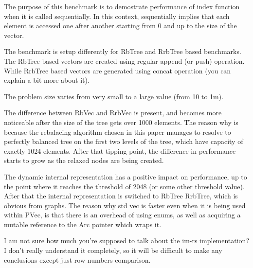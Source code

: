 

The purpose of this benchmark is to demostrate performance of index function when it is called sequentially. In this context, sequentially implies that each element is accessed one after another starting from 0 and up to the size of the vector.

The benchmark is setup differently for RbTree and RrbTree based benchmarks. The RbTree based vectors are created using regular append (or push) operation. While RrbTree based vectors are generated using concat operation (you can explain a bit more about it). 

The problem size varies from very small to a large value (from 10 to 1m). 

The difference between RbVec and RrbVec is present, and becomes more noticeable after the size of the tree gets over 1000 elements. The reason why is because the rebalacing algorithm chosen in this paper manages to resolve to perfectly balanced tree on the first two levels of the tree, which have capacity of exactly 1024 elements. After that tipping point, the difference in performance starts to grow as the relaxed nodes are being created. 

The dynamic internal representation has a positive impact on performance, up to the point where it reaches the threshold of 2048 (or some other threshold value). After that the internal representation is switched to RbTree \/ RrbTree, which is obvious from graphs. The reason why std vec is faster even when it is being used within PVec, is that there is an overhead of using enums, as well as acquiring a mutable reference to the Arc pointer which wraps it. 

I am not sure how much you're supposed to talk about the im-rs implementation? I don't really understand it completely, so it will be difficult to make any conclusions except just row numbers comparison. 

